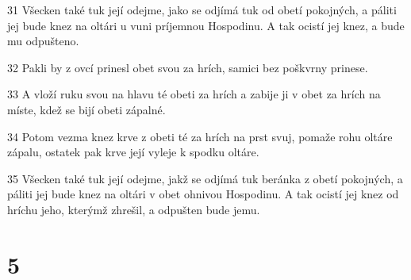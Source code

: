 \par 31 Všecken také tuk její odejme, jako se odjímá tuk od obetí pokojných, a páliti jej bude knez na oltári u vuni príjemnou Hospodinu. A tak ocistí jej knez, a bude mu odpušteno.
\par 32 Pakli by z ovcí prinesl obet svou za hrích, samici bez poškvrny prinese.
\par 33 A vloží ruku svou na hlavu té obeti za hrích a zabije ji v obet za hrích na míste, kdež se bijí obeti zápalné.
\par 34 Potom vezma knez krve z obeti té za hrích na prst svuj, pomaže rohu oltáre zápalu, ostatek pak krve její vyleje k spodku oltáre.
\par 35 Všecken také tuk její odejme, jakž se odjímá tuk beránka z obetí pokojných, a páliti jej bude knez na oltári v obet ohnivou Hospodinu. A tak ocistí jej knez od hríchu jeho, kterýmž zhrešil, a odpušten bude jemu.

\chapter{5}

